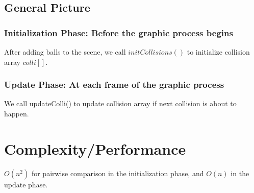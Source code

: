 \documentclass[twoside,10pt]{article}
\begin{document}
\subsection{General Picture}

\subsubsection{Initialization Phase: Before the graphic process begins}
After adding balls to the scene, we call $initCollisions()$ to initialize collision array $colli[]$.


\subsubsection{Update Phase: At each frame of the graphic process}
We call updateColli() to update collision array if next collision is about to happen.


\section{Complexity/Performance}
$O(n^2)$ for pairwise comparison in the initialization phase, and $O(n)$ in the update phase.
\end{document}
